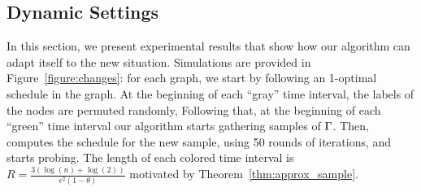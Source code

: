 
\subsection{Dynamic Settings}\label{sec:dynset}
In this section, we present experimental results that show
 how our algorithm can adapt itself to the new situation.
Simulations are provided in Figure~\ref{figure:changes}: for each graph, we
start by following an 1-optimal schedule in the graph. At the beginning of each
``gray'' time interval, the labels of the nodes are permuted randomly,  Following that, at
the beginning of each ``green'' time interval our algorithm starts gathering
samples of $\Gamma$. Then, \algonameapx computes the schedule for the new sample, using 50 rounds of iterations, and starts probing. The length of each colored time
interval is $R = \frac{3(\log(n)+\log(2))}{\epsilon^2(1-\theta)}$ motivated by
Theorem~\ref{thm:approx_sample}.







